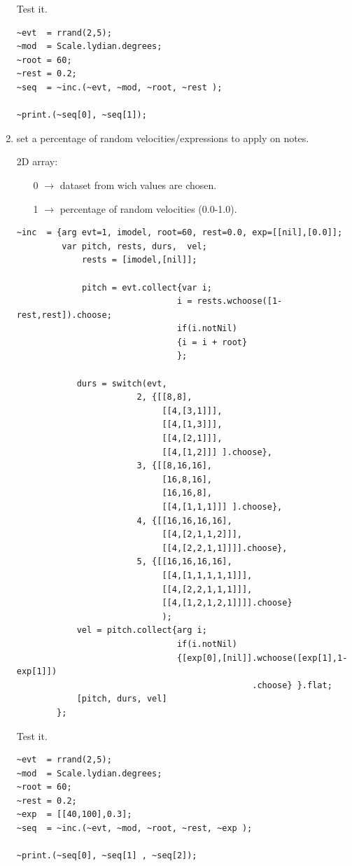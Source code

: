 \begin{enumerate}
Test it.

\begin{lstlisting}[frame=single] 
~evt  = rrand(2,5);
~mod  = Scale.lydian.degrees;
~root = 60;
~rest = 0.2;
~seq  = ~inc.(~evt, ~mod, ~root, ~rest );

~print.(~seq[0], ~seq[1]);
\end{lstlisting}

\item set a percentage of random velocities/expressions to apply on notes.
   
   2D array:

\begin{itemize}
\tightlist
\item [0] \(\rightarrow\) dataset from wich values are chosen.
\item [1] \(\rightarrow\) percentage of random velocities (0.0-1.0).
\end{itemize}

\begin{lstlisting}[frame=single, caption=random incise function] 
~inc  = {arg evt=1, imodel, root=60, rest=0.0, exp=[[nil],[0.0]];
         var pitch, rests, durs,  vel;
             rests = [imodel,[nil]];    
               
             pitch = evt.collect{var i; 
                                i = rests.wchoose([1-rest,rest]).choose;
                                if(i.notNil)
                                {i = i + root} 
                                };                               

            durs = switch(evt,  
                        2, {[[8,8],
                             [[4,[3,1]]],
                             [[4,[1,3]]],
                             [[4,[2,1]]],
                             [[4,[1,2]]] ].choose},
                        3, {[[8,16,16],
                             [16,8,16],
                             [16,16,8],
                             [[4,[1,1,1]]] ].choose},
                        4, {[[16,16,16,16],
                             [[4,[2,1,1,2]]],   
                             [[4,[2,2,1,1]]]].choose},
                        5, {[[16,16,16,16],
                             [[4,[1,1,1,1,1]]],   
                             [[4,[2,2,1,1,1]]],
                             [[4,[1,2,1,2,1]]]].choose} 
                             );                          
            vel = pitch.collect{arg i;
                                if(i.notNil)
                                {[exp[0],[nil]].wchoose([exp[1],1-exp[1]])
                                               .choose} }.flat;               
            [pitch, durs, vel] 
        };
\end{lstlisting}

Test it.
\begin{lstlisting}[frame=single] 
~evt  = rrand(2,5);
~mod  = Scale.lydian.degrees;
~root = 60;
~rest = 0.2;
~exp  = [[40,100],0.3];
~seq  = ~inc.(~evt, ~mod, ~root, ~rest, ~exp );

~print.(~seq[0], ~seq[1] , ~seq[2]);
\end{lstlisting}
\end{enumerate}

